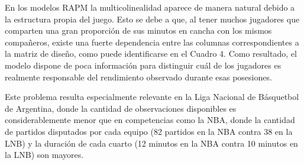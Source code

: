 \documentclass[
  12pt,
]{article}
\begin{document}
En los modelos RAPM la multicolinealidad aparece de manera natural
debido a la estructura propia del juego. Esto se debe a que, al tener
muchos jugadores que comparten una gran proporción de sus minutos en
cancha con los mismos compañeros, existe una fuerte dependencia entre
las columnas correspondientes a la matriz de diseño, como puede
identificarse en el Cuadro 4. Como resultado, el modelo dispone de poca
información para distinguir cuál de los jugadores es realmente
responsable del rendimiento observado durante esas posesiones.

Este problema resulta especialmente relevante en la Liga Nacional de
Básquetbol de Argentina, donde la cantidad de observaciones disponibles
es considerablemente menor que en competencias como la NBA, donde la
cantidad de partidos disputados por cada equipo (82 partidos en la NBA
contra 38 en la LNB) y la duración de cada cuarto (12 minutos en la NBA
contra 10 minutos en la LNB) son mayores.
\end{document}
